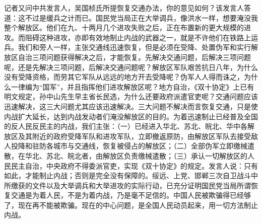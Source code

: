 记者又问中共发言人，吴国桢氏所提恢复交通办法，你的意见如何？该发言人答道：这不过是缓兵之计而已。国民党当局正在大举调兵，像洪水一样，想要淹没我整个解放区。他们在九、十两月几个进攻失败之后，正在布置新的更大规模的进攻。而阻碍这种进攻，亦即有效地制止内战的武器之一，就是不许他们在铁路上运兵。我们和旁人一样，主张交通线迅速恢复，但是必须在受降、处置伪军和实行解放区自治三项问题获得解决之后，才能恢复。先解决交通问题，后解决三项问题呢，还是先解决三项问题，后解决交通问题呢？解放区军队艰苦抗日八年，为什么没有受降资格，而劳其它军队从远远的地方开去受降呢？伪军人人得而诛之，为什么一律编为“国军”，并且指挥他们进攻解放区呢？地方自治，《双十协定》上已有明文规定，孙中山先生早主省长民选，为什么还要政府派遣官吏呢？交通问题应该迅速解决，这三大问题尤其应该迅速解决。三大问题不解决而言恢复交通，只是使内战扩大延长，达到内战发动者们淹没解放区的目的。为着迅速制止已经普及全国的反人民反民主的内战，我们主张：（一）已经进入华北、苏北、皖北、华中各解放区及其附近的政府受降军队和进攻军队，立即撤返原防，由解放区军队去接受敌人投降和驻防各城市与交通线，恢复被侵占的解放区；（二）全部伪军立即缴械遣散，在华北、苏北、皖北者，由解放区负责缴械遣散；（三）承认一切解放区的人民民主自治，中央政府不得委派官吏，实现《双十协定》的规定。发言人说：只有如此，才能制止内战；否则是完全没有保障的。绥远、上党、邯郸三次自卫战斗中所缴获的文件以及大举调兵和大举进攻的实际行动，已充分证明国民党当局所谓恢复交通是为着人民，不是为着内战，乃是毫不足信的。中国人民被欺骗得已经够了，现在再不能被欺骗。现在的中心问题，是全国人民动员起来，用一切方法制止内战。



